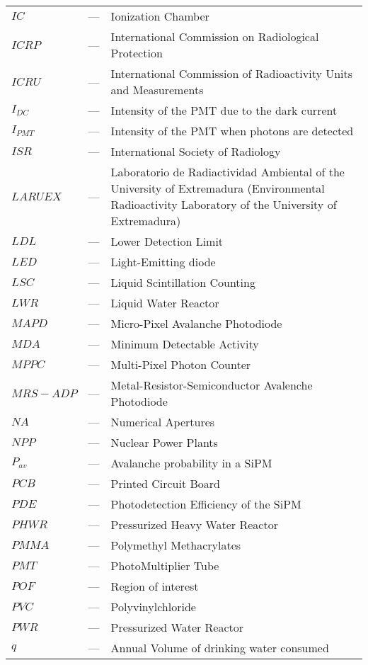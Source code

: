 \begin{longtable}{p{25mm} c p{120mm} }
$IC$ & --- & Ionization Chamber\\
$ICRP$ & --- & International Commission on Radiological Protection \\
$ICRU$ & --- & International Commission of Radioactivity Units 
\newline
and Measurements\\
$I_{DC}$ & --- & Intensity of the PMT due to the dark current\\
$I_{PMT}$ & --- & Intensity of the PMT when photons are detected\\
$ISR$ & --- & International Society of Radiology \\
$LARUEX$ & --- & Laboratorio de Radiactividad Ambiental of the University
\newline
of Extremadura (Environmental Radioactivity Laboratory
\newline
of the University of Extremadura)\\
$LDL$ & --- & Lower Detection Limit\\
$LED$ & --- & Light-Emitting diode \\
$LSC$ & --- & Liquid Scintillation Counting\\
$LWR$ & --- & Liquid Water Reactor\\
$MAPD$ & --- & Micro-Pixel Avalanche Photodiode\\
$MDA$ & --- & Minimum Detectable Activity\\
$MPPC$ & --- & Multi-Pixel Photon Counter\\
$MRS-ADP$ & --- & Metal-Resistor-Semiconductor Avalenche Photodiode\\
$NA$ & --- & Numerical Apertures\\
$NPP$ & --- & Nuclear Power Plants\\
$P_{av}$ & --- & Avalanche probability in a SiPM\\
$PCB$ & --- & Printed Circuit Board\\
$PDE$ & --- & Photodetection Efficiency of the SiPM\\
$PHWR$ & --- & Pressurized Heavy Water Reactor\\
$PMMA$ & --- & Polymethyl Methacrylates\\
$PMT$ & --- & PhotoMultiplier Tube\\
$POF$ & --- & Region of interest\\
$PVC$ & --- & Polyvinylchloride\\
$PWR$ & --- & Pressurized Water Reactor\\
$q$ & --- & Annual Volume of drinking water consumed\\

\end{longtable}
